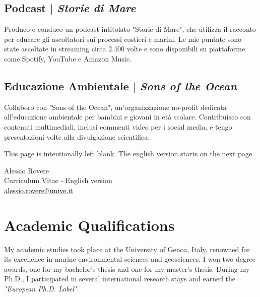\documentclass[11pt]{article}
\begin{document}
\subsection{Podcast $|$ {\normalfont\textit{Storie di Mare}}}
{\footnotesize Produco e conduco un podcast intitolato "Storie di Mare", che utilizza il racconto per educare gli ascoltatori sui processi costieri e marini. Le mie puntate sono state ascoltate in streaming circa 2.400 volte e sono disponibili su piattaforme come Spotify, YouTube e Amazon Music.}
\bigskip

\subsection{Educazione Ambientale $|$ {\normalfont\textit{Sons of the Ocean}}}
{\footnotesize Collaboro con "Sons of the Ocean", un'organizzazione no-profit dedicata all'educazione ambientale per bambini e giovani in età scolare. Contribuisco con contenuti multimediali, inclusi commenti video per i social media, e tengo presentazioni volte alla divulgazione scientifica.}

\newpage
This page is intentionally left blank. The english version starts on the next page.
\newpage

\newpage
\begin{center}
    {\fontsize{36}{36}\selectfont\interthin Alessio \interheavy Rovere} \\ \bigskip
    {\fontsize{14}{14}\selectfont\interthin Curriculum Vitae - English version}\\ \bigskip
    {\color{icnclr}\faEnvelope[regular]} \href{mailto:alessio.rovere@unive.it}{alessio.rovere@unive.it}
\end{center}

\section{Academic Qualifications}
{\normalfont My academic studies took place at the University of Genoa, Italy, renowned for its excellence in marine environmental sciences and geosciences. I won two degree awards, one for my bachelor's thesis and one for my master's thesis. During my Ph.D., I participated in several international research stays and earned the \textit{"European Ph.D. Label"}.} \\

\bigskip
\end{document}
